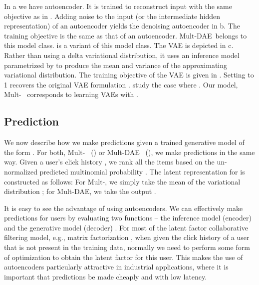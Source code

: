 \documentclass[sigconf]{acmart}
\newcommand{\mvae}{{\small Mult-}}
\newcommand{\mdae}{{\small Mult-}\gls{DAE}}
\begin{document}
In a we have autoencoder. It is trained to reconstruct input with the same objective as in . 
Adding noise to the input (or the intermediate hidden representation) 
of an autoencoder yields the denoising autoencoder in b. The training objective is the same as that of an autoencoder. 
\mdae~belongs to this model class.  \citep{wu2016collaborative} is a variant of this model class. 
The \gls{VAE} is depicted in c. Rather than using a delta variational distribution, it uses an inference model parametrized by 
 to produce the mean and variance of the approximating variational distribution. 
The training objective of the \gls{VAE} is given in . 
Setting  to 1 recovers the original \gls{VAE} formulation \citep{kingma2013auto,rezende2014stochastic}. 
\citet{higgins2017beta} study the case where . Our model, \mvae~ corresponds to learning \glspl{VAE} with .

\subsection{Prediction}\label{sec:pred}

We now describe how we make predictions given a trained generative model of the form 
. For both, \mvae~ () or \mdae~ (), we make predictions in the same way. 
Given a user's click history , we rank all the items based on the un-normalized predicted multinomial probability . 
The latent representation  for  is constructed as follows: 
For \mvae, we simply take the mean of the variational distribution ; for \mdae, we take the output . 

It is easy to see the advantage of using autoencoders. 
We can effectively make predictions for users by evaluating two functions -- the inference model (encoder)  and the generative model (decoder) . 
For most of the latent factor collaborative filtering model, e.g., matrix factorization 
\citep{hu2008collaborative,gopalan2015scalable}, when given the click history of a user that is not 
present in the training data, normally we need to perform some form of optimization to obtain the latent factor 
for this user. 
This makes the use of autoencoders particularly attractive in industrial applications,
where it is important that predictions be made cheaply and with low latency.
 
\end{document}
